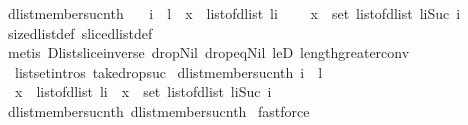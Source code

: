 \begin{isabellebody}
\ dlist{\isacharunderscore}member{\isacharunderscore}suc{\isacharunderscore}nth{}{\isacharcolon}\ \isanewline
\ \ {\isachardoublequoteopen}i\ {\isacharless}\ {\isacharparenleft}{\isacharhash}l{\isacharparenright}\ {\isasymLongrightarrow}\ x\ {\isacharequal}\ {\isacharparenleft}list{\isacharunderscore}of{\isacharunderscore}dlist\ l{\isacharparenright}{\isacharbang}i\ {\isasymLongrightarrow}\ \isanewline
\ \ x\ {\isasymin}\ set\ {\isacharparenleft}list{\isacharunderscore}of{\isacharunderscore}dlist\ {\isacharparenleft}l{\isasymdagger}i{\isachardot}{\isachardot}{\isacharparenleft}Suc\ i{\isacharparenright}{\isacharparenright}{\isacharparenright}{\isachardoublequoteclose}\isanewline
%
\isadelimproof
%
\endisadelimproof
%
\isatagproof
{}\isamarkupfalse%
\ size{\isacharunderscore}dlist{\isacharunderscore}def\ slice{\isacharunderscore}dlist{\isacharunderscore}def\isanewline
{}\isamarkupfalse%
\ {\isacharparenleft}metis\ Dlist{\isacharunderscore}slice{\isacharunderscore}inverse\ drop{\isacharunderscore}Nil\ drop{\isacharunderscore}eq{\isacharunderscore}Nil\ leD\ length{\isacharunderscore}greater{\isacharunderscore}{}{\isacharunderscore}conv\ \isanewline
\ \ list{\isachardot}set{\isacharunderscore}intros{\isacharparenleft}{}{\isacharparenright}\ take{\isacharunderscore}drop{\isacharunderscore}suc{\isacharparenright}%
\endisatagproof
{\isafoldproof}%
%
\isadelimproof
\isanewline
%
\endisadelimproof
\isanewline
{}\isamarkupfalse%
\ dlist{\isacharunderscore}member{\isacharunderscore}suc{\isacharunderscore}nth{\isacharcolon}\ {\isachardoublequoteopen}i\ {\isacharless}\ {\isacharparenleft}{\isacharhash}l{\isacharparenright}\ {\isasymLongrightarrow}\ \isanewline
\ \ {\isacharparenleft}x\ {\isacharequal}\ {\isacharparenleft}list{\isacharunderscore}of{\isacharunderscore}dlist\ l{\isacharparenright}{\isacharbang}i{\isacharparenright}\ {\isasymlongleftrightarrow}\ {\isacharparenleft}x\ {\isasymin}\ set\ {\isacharparenleft}list{\isacharunderscore}of{\isacharunderscore}dlist\ {\isacharparenleft}l{\isasymdagger}i{\isachardot}{\isachardot}{\isacharparenleft}Suc\ i{\isacharparenright}{\isacharparenright}{\isacharparenright}{\isacharparenright}{\isachardoublequoteclose}\isanewline
%
\isadelimproof
%
\endisadelimproof
%
\isatagproof
{}\isamarkupfalse%
\ dlist{\isacharunderscore}member{\isacharunderscore}suc{\isacharunderscore}nth{}\ dlist{\isacharunderscore}member{\isacharunderscore}suc{\isacharunderscore}nth{}\isanewline
{}\isamarkupfalse%
\ fastforce%

\end{isabellebody}
